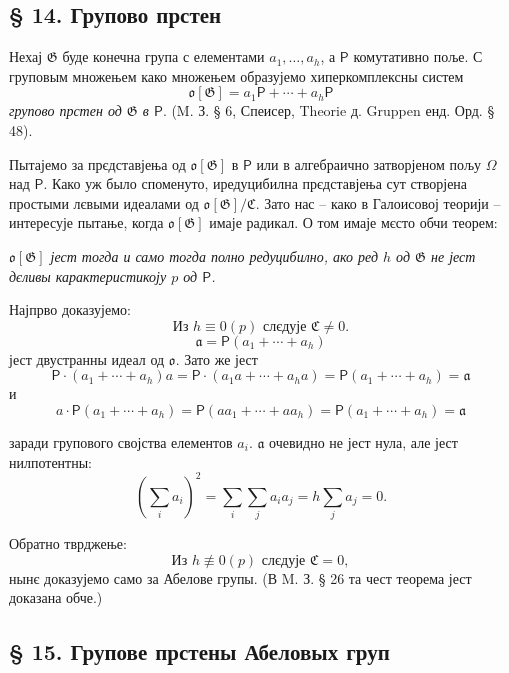 \documentclass[11pt]{article}
\begin{document}
\subsection*{§ 14. Групово прстен}\label{der-gruppenring}

Нехај \(\mathfrak G\) буде конечна група с елементами \(a_1,\ldots,a_h\), а \(\mathsf P\) комутативно поље. С груповым множењем како множењем образујемо хиперкомплексны систем
\[
\mathfrak o[\mathfrak G]=a_1\mathsf P+\cdots+a_h\mathsf P
\]
\emph{групово прстен од \(\mathfrak G\) в \(\mathsf P\)}. (M. З. § 6, Спеисер, Theorie д. Gruppen енд. Орд. § 48).

Пытајемо за прєдставјења од \(\mathfrak o[\mathfrak G]\) в \(\mathsf P\) или в алгебраично затворјеном пољу \(\Omega\) над \(\mathsf P\). Како уж было споменуто, иредуцибилна прєдставјења сут створјена простыми лєвыми идеалами од \(\mathfrak o[\mathfrak G]/\mathfrak C\). Зато нас -- како в Галоисовој теорији -- интересује пытање, когда \(\mathfrak o[\mathfrak G]\) имаје радикал. О том имаје мєсто обчи теорем:

\begin{center}
\emph{\(\mathfrak o[\mathfrak G]\) јест тогда и само тогда полно редуцибилно, ако ред \(h\) од \(\mathfrak G\) не јест дєливы карактеристикоју \(p\) од \(\mathsf P\).}
\end{center}

Најпрво доказујемо:
\[
\text{Из } h\equiv0(p) \text{ слєдује } \mathfrak C\ne 0.
\]
\[
\mathfrak a=\mathsf P(a_1+\cdots+a_h)
\]
јест двустранны идеал од \(\mathfrak o\). Зато же јест
\[
\mathsf P\cdot(a_1+\cdots+a_h)a
=\mathsf P\cdot(a_1a+\cdots+a_ha)
=\mathsf P(a_1+\cdots+a_h)=\mathfrak a
\]
и
\[
a\cdot\mathsf P(a_1+\cdots+a_h)
=\mathsf P(aa_1+\cdots+aa_h)
=\mathsf P(a_1+\cdots+a_h)=\mathfrak a
\]

заради групового својства елементов \(a_i\). \(\mathfrak a\) очевидно не јест нула, але јест нилпотентны:
\[
\left(\sum_i a_i\right)^2=\sum_i\sum_j a_i a_j
=h\sum_j a_j=0.
\]

Обратно тврджење:
\[
\text{Из } h\not\equiv0(p) \text{ слєдује } \mathfrak C=0,
\]
нынє доказујемо само за Абелове групы. (В M. З. § 26 та чест теорема јест доказана обче.)

\subsection*{§ 15. Групове прстены Абеловых груп}\label{die-gruppenringe-abelscher-gruppen}
\end{document}
